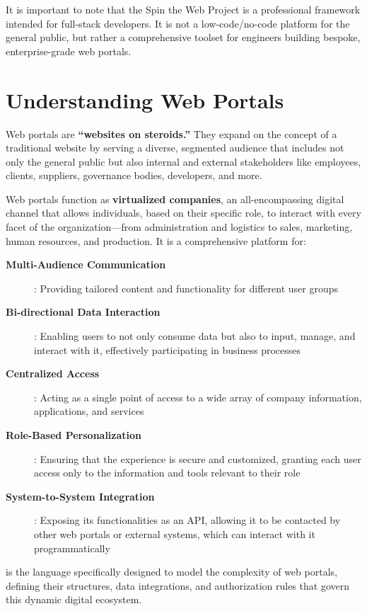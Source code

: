 It is important to note that the Spin the Web Project is a professional framework intended for full-stack developers. It is not a low-code/no-code platform for the general public, but rather a comprehensive toolset for engineers building bespoke, enterprise-grade web portals.

\section{Understanding Web Portals}
\label{sec:web-portals}

Web portals are \textbf{``websites on steroids.''} They expand on the concept of a traditional website by serving a diverse, segmented audience that includes not only the general public but also internal and external stakeholders like employees, clients, suppliers, governance bodies, developers, and more.

Web portals function as \textbf{virtualized companies}, an all-encompassing digital channel that allows individuals, based on their specific role, to interact with every facet of the organization—from administration and logistics to sales, marketing, human resources, and production. It is a comprehensive platform for:

\begin{description}
\item[\textbf{Multi-Audience Communication}]: Providing tailored content and functionality for different user groups
\item[\textbf{Bi-directional Data Interaction}]: Enabling users to not only consume data but also to input, manage, and interact with it, effectively participating in business processes
\item[\textbf{Centralized Access}]: Acting as a single point of access to a wide array of company information, applications, and services
\item[\textbf{Role-Based Personalization}]: Ensuring that the experience is secure and customized, granting each user access only to the information and tools relevant to their role
\item[\textbf{System-to-System Integration}]: Exposing its functionalities as an API, allowing it to be contacted by other web portals or external systems, which can interact with it programmatically
\end{description}

\wbdl{} is the language specifically designed to model the complexity of web portals, defining their structures, data integrations, and authorization rules that govern this dynamic digital ecosystem.

